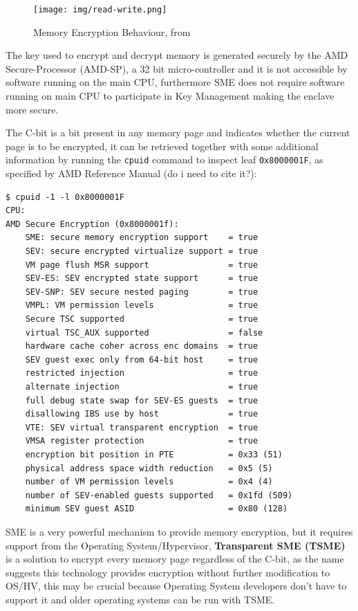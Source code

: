 \documentclass[twocolumn]{article}
\begin{document}
\begin{figure}
    \centering
    \texttt{[image: img/read-write.png]}
    \caption{Memory Encryption Behaviour, from \cite{memory-encryption}}
\end{figure}

The key used to encrypt and decrypt memory is generated securely by the AMD Secure-Processor (AMD-SP), a 32 bit micro-controller and it is not accessible by software running on the main CPU, furthermore SME does not require software running on main CPU to participate in Key Management making the enclave more secure.

The C-bit is a bit present in any memory page and indicates whether the current page is to be encrypted, it can be retrieved together with some additional information by running the \texttt{cpuid} command to inspect leaf \texttt{0x8000001F}, as specified by AMD Reference Manual (do i need to cite it?):

\begin{verbatim}
$ cpuid -1 -l 0x8000001F
CPU:
AMD Secure Encryption (0x8000001f):
    SME: secure memory encryption support    = true
    SEV: secure encrypted virtualize support = true
    VM page flush MSR support                = true
    SEV-ES: SEV encrypted state support      = true
    SEV-SNP: SEV secure nested paging        = true
    VMPL: VM permission levels               = true
    Secure TSC supported                     = true
    virtual TSC_AUX supported                = false
    hardware cache coher across enc domains  = true
    SEV guest exec only from 64-bit host     = true
    restricted injection                     = true
    alternate injection                      = true
    full debug state swap for SEV-ES guests  = true
    disallowing IBS use by host              = true
    VTE: SEV virtual transparent encryption  = true
    VMSA register protection                 = true
    encryption bit position in PTE           = 0x33 (51)
    physical address space width reduction   = 0x5 (5)    
    number of VM permission levels           = 0x4 (4)
    number of SEV-enabled guests supported   = 0x1fd (509)
    minimum SEV guest ASID                   = 0x80 (128)
\end{verbatim}
    
SME is a very powerful mechanism to provide memory encryption, but it requires support from the Operating System/Hypervisor, \textbf{Transparent SME (TSME)} is a solution to encrypt every memory page regardless of the C-bit, as the name suggests this technology provides encryption without further modification to OS/HV, this may be crucial because Operating System developers don't have to support it and older operating systems can be run with TSME.
\end{document}
